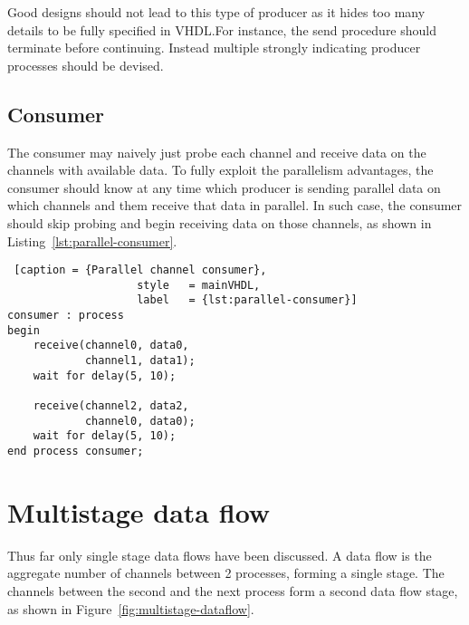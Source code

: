 \documentclass{report}
\begin{document}
Good designs should not lead to this type of producer as it hides too many
details to be fully specified in VHDL.\@ For instance, the send procedure should
terminate before continuing. Instead multiple strongly indicating producer
processes should be devised.

\subsection{Consumer}

The consumer may naively just probe each channel and receive data on the
channels with available data. To fully exploit the parallelism advantages, the
consumer should know at any time which producer is sending parallel data on
which channels and them receive that data in parallel. In such case, the
consumer should skip probing and begin receiving data on those channels, as
shown in Listing~\ref{lst:parallel-consumer}.

\begin{lstlisting} [caption = {Parallel channel consumer},
                    style   = mainVHDL,
                    label   = {lst:parallel-consumer}]
consumer : process
begin
    receive(channel0, data0,
            channel1, data1);
    wait for delay(5, 10);

    receive(channel2, data2,
            channel0, data0);
    wait for delay(5, 10);
end process consumer;
\end{lstlisting}

\section{Multistage data flow}

Thus far only single stage data flows have been discussed. A data flow is the
aggregate number of channels between 2 processes, forming a single stage. The
channels between the second and the next process form a second data flow stage,
as shown in Figure~\ref{fig:multistage-dataflow}.
\end{document}
